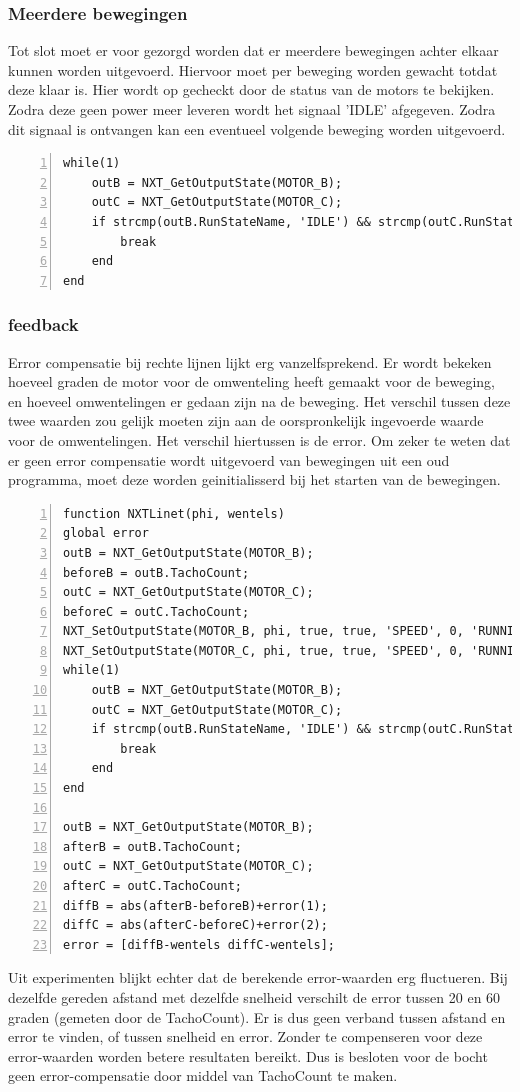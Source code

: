 \documentclass[a4paper]{article}
\begin{document}
\subsubsection{Meerdere bewegingen}
Tot slot moet er voor gezorgd worden dat er meerdere bewegingen achter elkaar kunnen worden uitgevoerd. Hiervoor moet per beweging worden gewacht totdat deze klaar is. Hier wordt op gecheckt door de status van de motors te bekijken. Zodra deze geen power meer leveren wordt het signaal 'IDLE' afgegeven. Zodra dit signaal is ontvangen kan een eventueel volgende beweging worden uitgevoerd.
\begin{lstlisting}[caption=Meerdere moves, label=lst:moves, numbers=left]
while(1)
    outB = NXT_GetOutputState(MOTOR_B);
    outC = NXT_GetOutputState(MOTOR_C);
    if strcmp(outB.RunStateName, 'IDLE') && strcmp(outC.RunStateName, 'IDLE')
        break
    end
end
\end{lstlisting}
\subsubsection{feedback}
Error compensatie bij rechte lijnen lijkt erg vanzelfsprekend. Er wordt bekeken hoeveel graden de motor voor de omwenteling heeft gemaakt voor de beweging, en hoeveel omwentelingen er gedaan zijn na de beweging. Het verschil tussen deze twee waarden zou gelijk moeten zijn aan de oorspronkelijk ingevoerde waarde voor de omwentelingen. Het verschil hiertussen is de error. Om zeker te weten dat er geen error compensatie wordt uitgevoerd van bewegingen uit een oud programma, moet deze worden geinitialisserd bij het starten van de bewegingen. 
\begin{lstlisting}[caption=Error compensatie bij een lijn, label=lst:lineerror, numbers=left]
function NXTLinet(phi, wentels)
global error
outB = NXT_GetOutputState(MOTOR_B);
beforeB = outB.TachoCount;
outC = NXT_GetOutputState(MOTOR_C);
beforeC = outC.TachoCount;
NXT_SetOutputState(MOTOR_B, phi, true, true, 'SPEED', 0, 'RUNNING', wentels-error(1), 'dontreply');
NXT_SetOutputState(MOTOR_C, phi, true, true, 'SPEED', 0, 'RUNNING', wentels-error(2), 'dontreply');
while(1)
    outB = NXT_GetOutputState(MOTOR_B);
    outC = NXT_GetOutputState(MOTOR_C);
    if strcmp(outB.RunStateName, 'IDLE') && strcmp(outC.RunStateName, 'IDLE')
        break
    end
end

outB = NXT_GetOutputState(MOTOR_B);
afterB = outB.TachoCount;
outC = NXT_GetOutputState(MOTOR_C);
afterC = outC.TachoCount;
diffB = abs(afterB-beforeB)+error(1);
diffC = abs(afterC-beforeC)+error(2);
error = [diffB-wentels diffC-wentels];
\end{lstlisting}
Uit experimenten blijkt echter dat de berekende error-waarden erg fluctueren. Bij dezelfde gereden afstand met dezelfde snelheid verschilt de error tussen 20 en 60 graden (gemeten door de TachoCount). Er is dus geen verband tussen afstand en error te vinden, of tussen snelheid en error. Zonder te compenseren voor deze error-waarden worden betere resultaten bereikt. Dus is besloten voor de bocht geen error-compensatie door middel van TachoCount te maken.
\end{document}
